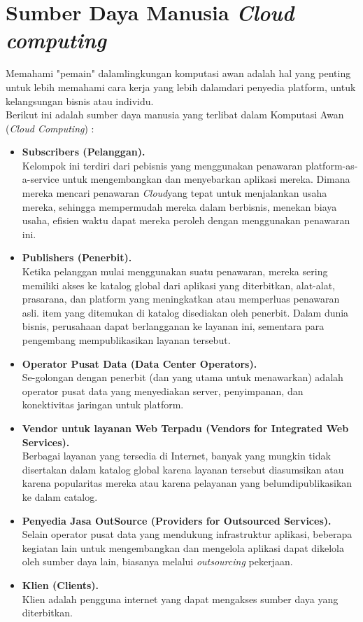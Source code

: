 \section{Sumber  Daya Manusia \textit{Cloud computing}}
Memahami "pemain" dalamlingkungan komputasi awan adalah hal yang penting untuk lebih memahami cara kerja yang lebih dalamdari penyedia platform, untuk kelangsungan bisnis atau individu.\\
Berikut ini adalah sumber daya manusia yang terlibat dalam Komputasi Awan  (\textit{Cloud Computing}) :
\begin{itemize}
\item \textbf{Subscribers (Pelanggan).}\\
Kelompok ini terdiri dari pebisnis yang menggunakan penawaran  platform-as-a-service untuk mengembangkan dan menyebarkan aplikasi mereka. Dimana mereka mencari penawaran \textit{Cloud}yang tepat untuk menjalankan usaha mereka, sehingga mempermudah mereka dalam berbisnis, menekan biaya usaha, efisien waktu dapat mereka peroleh  dengan menggunakan  penawaran ini.
\item \textbf{Publishers (Penerbit).}\\
Ketika pelanggan mulai menggunakan suatu penawaran, mereka sering memiliki akses ke katalog global dari aplikasi yang diterbitkan, alat-alat, prasarana, dan platform yang meningkatkan atau memperluas penawaran asli. item yang ditemukan di katalog disediakan oleh penerbit. Dalam dunia bisnis, perusahaan dapat berlangganan ke layanan ini, sementara para pengembang mempublikasikan   layanan tersebut.
\item \textbf{Operator  Pusat  Data (Data Center Operators).}\\
Se-golongan dengan penerbit (dan yang utama untuk menawarkan) adalah operator pusat data yang menyediakan server, penyimpanan, dan konektivitas jaringan untuk platform.
\item \textbf{Vendor untuk layanan Web Terpadu (Vendors for Integrated Web Services).}\\
Berbagai layanan yang tersedia di Internet, banyak yang mungkin tidak disertakan dalam katalog global karena layanan tersebut diasumsikan atau karena popularitas mereka atau karena pelayanan yang belumdipublikasikan ke dalam catalog.\\
\item \textbf{Penyedia Jasa OutSource (Providers for  Outsourced Services).}\\
Selain operator pusat data yang mendukung infrastruktur aplikasi, beberapa kegiatan lain untuk mengembangkan dan mengelola aplikasi dapat dikelola oleh sumber daya lain, biasanya melalui  \textit{outsourcing} pekerjaan.
\item \textbf{Klien (Clients).}\\
Klien adalah pengguna internet yang dapat mengakses sumber daya yang diterbitkan.
\end{itemize}
